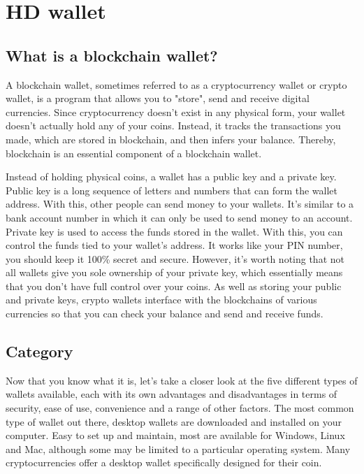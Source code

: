 \section{HD wallet}
\label{HD wallet}

\subsection{What is a blockchain wallet?}

A blockchain wallet, sometimes referred to as a cryptocurrency wallet or crypto wallet, is a program that allows you to "store", send and receive digital currencies. Since cryptocurrency doesn’t exist in any physical form, your wallet doesn't actually hold any of your coins. Instead, it tracks the transactions you made, which are stored in blockchain, and then infers your balance. Thereby, blockchain is an essential component of a blockchain wallet.

Instead of holding physical coins, a wallet has a public key and a private key. Public key is a long sequence of letters and numbers that can form the wallet address. With this, other people can send money to your wallets. It’s similar to a bank account number in which it can only be used to send money to an account. Private key is used to access the funds stored in the wallet. With this, you can control the funds tied to your wallet’s address. It works like your PIN number, you should keep it 100\% secret and secure. However, it’s worth noting that not all wallets give you sole ownership of your private key, which essentially means that you don’t have full control over your coins. As well as storing your public and private keys, crypto wallets interface with the blockchains of various currencies so that you can check your balance and send and receive funds.

\subsection{Category}

Now that you know what it is, let’s take a closer look at the five different types of wallets available, each with its own advantages and disadvantages in terms of security, ease of use, convenience and a range of other factors. The most common type of wallet out there, desktop wallets are downloaded and installed on your computer. Easy to set up and maintain, most are available for Windows, Linux and Mac, although some may be limited to a particular operating system. Many cryptocurrencies offer a desktop wallet specifically designed for their coin.

